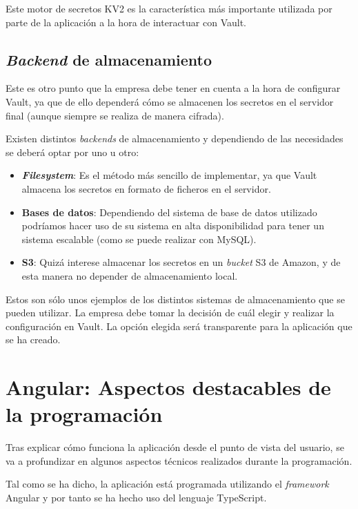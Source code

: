 \documentclass{\ClassPath/viu-tfm-template}
\begin{document}
Este motor de secretos KV2 es la característica más importante utilizada por parte de la aplicación a la hora de interactuar con Vault.

\hypertarget{backend_almacenamiento}{}
\subsection{\textit{Backend} de almacenamiento}

Este es otro punto que la empresa debe tener en cuenta a la hora de configurar Vault, ya que de ello dependerá cómo se almacenen los secretos en el servidor final (aunque siempre se realiza de manera cifrada).

Existen distintos \textit{backends} de almacenamiento y dependiendo de las necesidades se deberá optar por uno u otro:

\begin{itemize}
    \item \textbf{\textit{Filesystem}}: Es el método más sencillo de implementar, ya que Vault almacena los secretos en formato de ficheros en el servidor.
    \item \textbf{Bases de datos}: Dependiendo del sistema de base de datos utilizado podríamos hacer uso de su sistema en alta disponibilidad para tener un sistema escalable (como se puede realizar con MySQL).
    \item \textbf{S3}: Quizá interese almacenar los secretos en un \textit{bucket} S3 de Amazon, y de esta manera no depender de almacenamiento local.
\end{itemize}

Estos son sólo unos ejemplos de los distintos sistemas de almacenamiento que se pueden utilizar. La empresa debe tomar la decisión de cuál elegir y realizar la configuración en Vault. La opción elegida será transparente para la aplicación que se ha creado.


\section{Angular: Aspectos destacables de la programación}

Tras explicar cómo funciona la aplicación desde el punto de vista del usuario, se va a profundizar en algunos aspectos técnicos realizados durante la programación.

Tal como se ha dicho, la aplicación está programada utilizando el \textit{framework} Angular y por tanto se ha hecho uso del lenguaje TypeScript.
\end{document}
